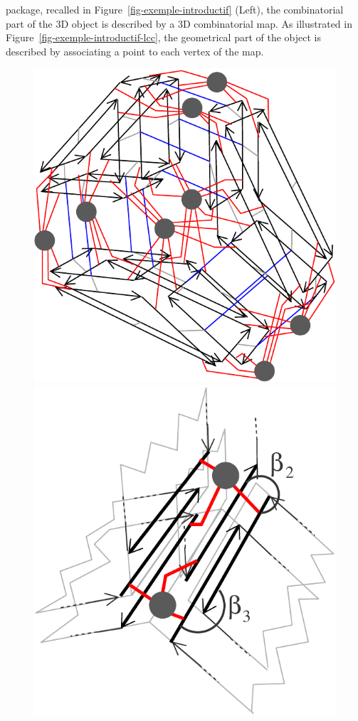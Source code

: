 package, recalled in Figure~\ref{fig-exemple-introductif} (Left), the
combinatorial part of the 3D object is described by a 3D combinatorial
map. As illustrated in Figure~\ref{fig-exemple-introductif-lcc}, the
geometrical part of the object is described by associating a point to
each vertex of the map.
%
\def\LargFig{.3\textwidth}
\begin{figure}[h]
  \begin{ccTexOnly}
    \begin{center}
      \includegraphics[width=\LargFig]{Linear_cell_complex/fig/pdf/intuitif-example-lcc}\qquad
      \includegraphics[width=\LargFig]{Linear_cell_complex/fig/pdf/intuitif-example-lcc-zoom}

\end{center}
\end{ccTexOnly}
\end{figure}
